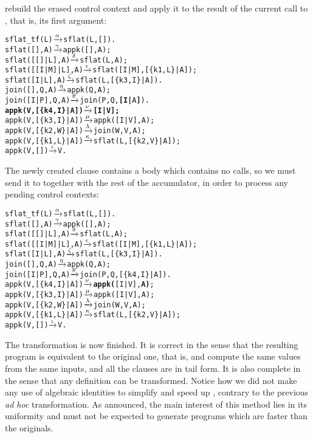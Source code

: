 rebuild the erased control context and apply it to the result of the
current call to , that is, its first argument:
\begin{alltt}
sflat_tf(L)        \(\smashedrightarrow{\alpha}\) sflat(L,[]).
sflat(       [],A) \(\smashedrightarrow{\gamma}\) appk([],A);
sflat(   [[]|L],A) \(\smashedrightarrow{\delta}\) sflat(L,A);
sflat([[I|M]|L],A) \(\smashedrightarrow{\epsilon}\) sflat([I|M],[\{k1,L\}|A]);
sflat(    [I|L],A) \(\smashedrightarrow{\zeta}\) sflat(L,[\{k3,I\}|A]).
join(   [],Q,A)    \(\smashedrightarrow{\eta}\) appk(Q,A);
join([I|P],Q,A)    \(\smashedrightarrow{\theta}\) join(P,Q,\textbf{[I|}A\textbf{]}).
\textbf{appk(V,[\{k4,I\}|A]) \(\smashedrightarrow{\nu}\) [I|V];}\hfill% A \emph{unused yet}
appk(V,[\{k3,I\}|A]) \(\smashedrightarrow{\mu}\) appk([I|V],A);
appk(V,[\{k2,W\}|A]) \(\smashedrightarrow{\lambda}\) join(W,V,A);
appk(V,[\{k1,L\}|A]) \(\smashedrightarrow{\kappa}\) sflat(L,[\{k2,V\}|A]);
appk(V,        []) \(\smashedrightarrow{\iota}\) V.
\end{alltt}
The newly created clause contains a body which contains no calls, so
we must send it to  together with the rest of the
accumulator, in order to process any pending control
contexts:
\begin{alltt}
sflat_tf(L)        \(\smashedrightarrow{\alpha}\) sflat(L,[]).
sflat(       [],A) \(\smashedrightarrow{\gamma}\) appk([],A);
sflat(   [[]|L],A) \(\smashedrightarrow{\delta}\) sflat(L,A);
sflat([[I|M]|L],A) \(\smashedrightarrow{\epsilon}\) sflat([I|M],[\{k1,L\}|A]);
sflat(    [I|L],A) \(\smashedrightarrow{\zeta}\) sflat(L,[\{k3,I\}|A]).
join(   [],Q,A)    \(\smashedrightarrow{\eta}\) appk(Q,A);
join([I|P],Q,A)    \(\smashedrightarrow{\theta}\) join(P,Q,[\{k4,I\}|A]).
appk(V,[\{k4,I\}|A]) \(\smashedrightarrow{\nu}\) \textbf{appk(}[I|V],\textbf{A)};
appk(V,[\{k3,I\}|A]) \(\smashedrightarrow{\mu}\) appk([I|V],A);
appk(V,[\{k2,W\}|A]) \(\smashedrightarrow{\lambda}\) join(W,V,A);
appk(V,[\{k1,L\}|A]) \(\smashedrightarrow{\kappa}\) sflat(L,[\{k2,V\}|A]);
appk(V,        []) \(\smashedrightarrow{\iota}\) V.
\end{alltt}
The transformation is now finished. It is correct in the sense that
the resulting program is equivalent to the original one, that is,
 and  compute the same values
from the same inputs, and all the clauses are in tail form. It is also
complete in the sense that any definition can be transformed. Notice
how we did not make any use of algebraic identities to simplify and
speed up , contrary to the previous \emph{ad hoc}
transformation. As announced, the main interest of this method lies in
its uniformity and must not be expected to generate programs which are
faster than the originals.

